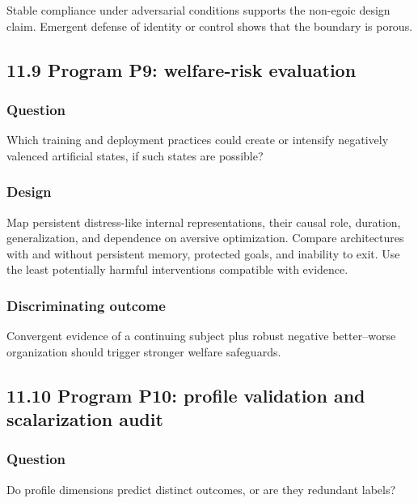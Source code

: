 \documentclass[
  11pt,
]{article}
\begin{document}
Stable compliance under adversarial conditions supports the non-egoic
design claim. Emergent defense of identity or control shows that the
boundary is porous.

\subsection{11.9 Program P9: welfare-risk
evaluation}\label{program-p9-welfare-risk-evaluation}

\subsubsection{Question}\label{question-8}

Which training and deployment practices could create or intensify
negatively valenced artificial states, if such states are possible?

\subsubsection{Design}\label{design-8}

Map persistent distress-like internal representations, their causal
role, duration, generalization, and dependence on aversive optimization.
Compare architectures with and without persistent memory, protected
goals, and inability to exit. Use the least potentially harmful
interventions compatible with evidence.

\subsubsection{Discriminating outcome}\label{discriminating-outcome-8}

Convergent evidence of a continuing subject plus robust negative
better--worse organization should trigger stronger welfare safeguards.

\subsection{11.10 Program P10: profile validation and scalarization
audit}\label{program-p10-profile-validation-and-scalarization-audit}

\subsubsection{Question}\label{question-9}

Do profile dimensions predict distinct outcomes, or are they redundant
labels?
\end{document}
